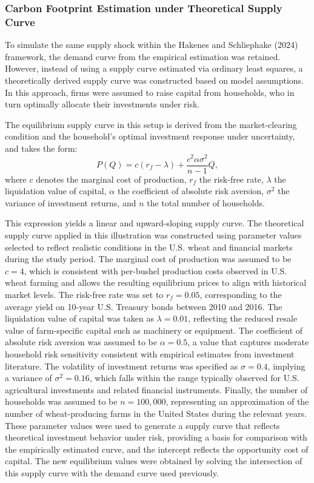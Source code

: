 \documentclass[12pt,a4paper]{article}%
\begin{document}
\subsubsection{Carbon Footprint Estimation under Theoretical Supply Curve}

To simulate the same supply shock within the Hakenes and Schliephake (2024) framework, the demand curve from the empirical estimation was retained. However, instead of using a supply curve estimated via ordinary least squares, a theoretically derived supply curve was constructed based on model assumptions. In this approach, firms were assumed to raise capital from households, who in turn optimally allocate their investments under risk.

The equilibrium supply curve in this setup is derived from the market-clearing condition and the household's optimal investment response under uncertainty, and takes the form:
\[
P(Q) = c(r_f - \lambda) + \frac{c^2 \alpha \sigma^2}{n - 1} Q,
\]
where \( c \) denotes the marginal cost of production, \( r_f \) the risk-free rate, \( \lambda \) the liquidation value of capital, \( \alpha \) the coefficient of absolute risk aversion, \( \sigma^2 \) the variance of investment returns, and \( n \) the total number of households. 

This expression yields a linear and upward-sloping supply curve. The theoretical supply curve applied in this illustration was constructed using parameter values selected to reflect realistic conditions in the U.S. wheat and financial markets during the study period. The marginal cost of production was assumed to be $c = 4$, which is consistent with per-bushel production costs observed in U.S. wheat farming and allows the resulting equilibrium prices to align with historical market levels. The risk-free rate was set to $r_f = 0.05$, corresponding to the average yield on 10-year U.S. Treasury bonds between 2010 and 2016. The liquidation value of capital was taken as $\lambda = 0.01$, reflecting the reduced resale value of farm-specific capital such as machinery or equipment. The coefficient of absolute risk aversion was assumed to be $\alpha = 0.5$, a value that captures moderate household risk sensitivity consistent with empirical estimates from investment literature. The volatility of investment returns was specified as $\sigma = 0.4$, implying a variance of $\sigma^2 = 0.16$, which falls within the range typically observed for U.S. agricultural investments and related financial instruments. Finally, the number of households was assumed to be $n = 100{,}000$, representing an approximation of the number of wheat-producing farms in the United States during the relevant years. These parameter values were used to generate a supply curve that reflects theoretical investment behavior under risk, providing a basis for comparison with the empirically estimated curve, and the intercept reflects the opportunity cost of capital. The new equilibrium values were obtained by solving the intersection of this supply curve with the demand curve used previously.
\end{document}
